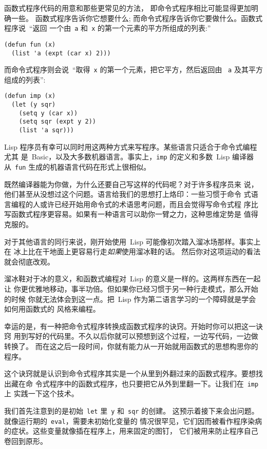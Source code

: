 函数式程序代码的用意和那些更常见的方法，
即命令式程序相比可能显得更加明确一些。
函数式程序告诉你它想要什么; 而命令式程序告诉你它要做什么。函数式程序说~``返回
一个由~\texttt{a} 和~\texttt{x} 的第一个元素的平方所组成的列表:''
\begin{lstlisting}
(defun fun (x)
  (list 'a (expt (car x) 2)))
\end{lstlisting}
而命令式程序则会说~``取得~\texttt{x} 的第一个元素，把它平方，然后返回由
~\texttt{a} 及其平方组成的列表'':
\begin{lstlisting}
(defun imp (x)
  (let (y sqr)
    (setq y (car x))
    (setq sqr (expt y 2))
    (list 'a sqr)))
\end{lstlisting}
Lisp 程序员有幸可以同时用这两种方式来写程序。某些语言只适合于命令式编程
\pozhehao{}尤其
是~Basic，以及大多数机器语言。事实上，\texttt{imp} 的定义和多数~Lisp
编译器从~\texttt{fun} 生成的机器语言代码在形式上很相似。

既然编译器能为你做，为什么还要自己写这样的代码呢？对于许多程序员来
说，他们甚至从没想过这个问题。语言给我们的思想打上烙印：一些习惯于命令
式语言编程的人或许已经开始用命令式的术语思考问题，而且会觉得写命令式程
序比写函数式程序更容易。如果有一种语言可以助你一臂之力，这种思维定势是
值得克服的。

对于其他语言的同行来说，刚开始使用~Lisp 可能像初次踏入溜冰场那样。事实上在
冰上比在干地面上更容易行走\pozhehao{}\emph{如果}使用溜冰鞋的话。
然后你对这项运动的看法就会彻底改观。

溜冰鞋对于冰的意义，和函数式编程对~Lisp 的意义是一样的。这两样东西在一起让
你更优雅地移动，事半功倍。但如果你已经习惯于另一种行走模式，那么开始的时候
你就无法体会到这一点。把~Lisp 作为第二语言学习的一个障碍就是学会如何用函数式的
风格来编程。

幸运的是，有一种把命令式程序转换成函数式程序的诀窍。开始时你可以把这一诀窍
用到写好的代码里。不久以后你就可以预想到这个过程，一边写代码，一边做转换了。
而在这之后一段时间，你就有能力从一开始就用函数式的思想构思你的程序。

这个诀窍就是认识到命令式程序其实是一个从里到外翻过来的函数式程序。要想找出藏在命
令式程序中的函数式程序，也只要把它从外到里翻一下。让我们在~\texttt{imp} 上
实践一下这个技术。

我们首先注意到的是初始~\texttt{let} 里~\texttt{y} 和~\texttt{sqr} 的创建。
这预示着接下来会出问题。就像运行期的~\texttt{eval}，需要未初始化变量的
情况很罕见，它们因而被看作程序染病的症状。这些变量就像插在程序上，用来固定的图钉，
它们被用来防止程序自己卷回到原形。

